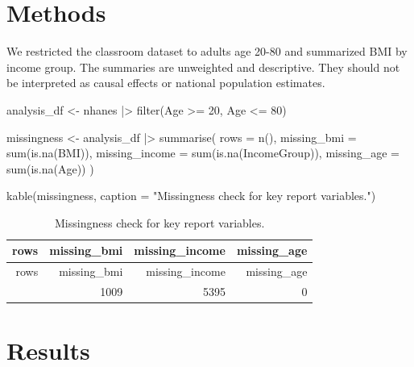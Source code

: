 \documentclass[
  letterpaper,
  DIV=11,
  numbers=noendperiod,
  oneside]{scrreprt}
\newenvironment{Shaded}{\begin{snugshade}}{\end{snugshade}}
\newcommand{\AttributeTok}[1]{\textcolor[rgb]{0.40,0.45,0.13}{#1}}
\newcommand{\DecValTok}[1]{\textcolor[rgb]{0.68,0.00,0.00}{#1}}
\newcommand{\FunctionTok}[1]{\textcolor[rgb]{0.28,0.35,0.67}{#1}}
\newcommand{\NormalTok}[1]{\textcolor[rgb]{0.00,0.23,0.31}{#1}}
\newcommand{\OtherTok}[1]{\textcolor[rgb]{0.00,0.23,0.31}{#1}}
\newcommand{\SpecialCharTok}[1]{\textcolor[rgb]{0.37,0.37,0.37}{#1}}
\newcommand{\StringTok}[1]{\textcolor[rgb]{0.13,0.47,0.30}{#1}}
\begin{document}
\section*{Methods}\label{methods-1}


We restricted the classroom dataset to adults age 20-80 and summarized
BMI by income group. The summaries are unweighted and descriptive. They
should not be interpreted as causal effects or national population
estimates.

\begin{Shaded}
\begin{Highlighting}[numbers=left,,]
\NormalTok{analysis\_df }\OtherTok{\textless{}{-}}\NormalTok{ nhanes }\SpecialCharTok{|\textgreater{}}
  \FunctionTok{filter}\NormalTok{(Age }\SpecialCharTok{\textgreater{}=} \DecValTok{20}\NormalTok{, Age }\SpecialCharTok{\textless{}=} \DecValTok{80}\NormalTok{)}

\NormalTok{missingness }\OtherTok{\textless{}{-}}\NormalTok{ analysis\_df }\SpecialCharTok{|\textgreater{}}
  \FunctionTok{summarise}\NormalTok{(}
    \AttributeTok{rows =} \FunctionTok{n}\NormalTok{(),}
    \AttributeTok{missing\_bmi =} \FunctionTok{sum}\NormalTok{(}\FunctionTok{is.na}\NormalTok{(BMI)),}
    \AttributeTok{missing\_income =} \FunctionTok{sum}\NormalTok{(}\FunctionTok{is.na}\NormalTok{(IncomeGroup)),}
    \AttributeTok{missing\_age =} \FunctionTok{sum}\NormalTok{(}\FunctionTok{is.na}\NormalTok{(Age))}
\NormalTok{  )}

\FunctionTok{kable}\NormalTok{(missingness, }\AttributeTok{caption =} \StringTok{"Missingness check for key report variables."}\NormalTok{)}
\end{Highlighting}
\end{Shaded}

\begin{longtable}[]{@{}rrrr@{}}
\caption{Missingness check for key report variables.}\tabularnewline
\toprule\noalign{}
rows & missing\_bmi & missing\_income & missing\_age \\
\midrule\noalign{}
\endfirsthead
\toprule\noalign{}
rows & missing\_bmi & missing\_income & missing\_age \\
\midrule\noalign{}
\endhead
\bottomrule\noalign{}
\endlastfoot
57137 & 1009 & 5395 & 0 \\
\end{longtable}

\section*{Results}\label{results-1}
\end{document}
